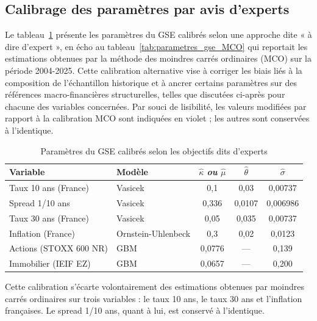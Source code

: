\subsection{Calibrage des paramètres par avis d'experts}

Le tableau~\ref{tab:parametres_gse_experts} présente les paramètres du GSE calibrés selon une approche dite « à dire d'expert », en écho au tableau~\ref{tab:parametres_gse_MCO} qui reportait les estimations obtenues par la méthode des moindres carrés ordinaires (MCO) sur la période 2004-2025.
Cette calibration alternative vise à corriger les biais liés à la composition de l'échantillon historique et à ancrer certains paramètres sur des références macro-financières structurelles, telles que discutées ci-après pour chacune des variables concernées. Par souci de lisibilité, les valeurs modifiées par rapport à la calibration MCO sont indiquées en violet ; les autres sont conservées à l'identique.

\begin{table}[H]
\centering
\caption{Paramètres du GSE calibrés selon les objectifs dits d'experts}
\label{tab:parametres_gse_experts}
\begin{tabular}{llccc}
\hline
\textbf{Variable} & \textbf{Modèle} & $\hat{\kappa}$ \textit{ou} $\hat{\mu}$ & $\hat{\theta}$ & $\hat{\sigma}$ \\
\hline
Taux 10 ans (France)   & Vasicek & \textcolor[HTML]{A100FF}{0,1} & \textcolor[HTML]{A100FF}{0,03} & 0,00737 \\
Spread 1/10 ans   & Vasicek & 0,336 & 0,0107 & 0,006986 \\
Taux 30 ans (France)   & Vasicek & \textcolor[HTML]{A100FF}{0,05} & \textcolor[HTML]{A100FF}{0,035} & 0,00737 \\
Inflation (France)     & Ornstein-Uhlenbeck & \textcolor[HTML]{A100FF}{0,3} & \textcolor[HTML]{A100FF}{0,02} & 0,0123 \\
Actions (STOXX 600 NR) & GBM & 0,0776 & — & 0,139 \\
Immobilier (IEIF EZ)   & GBM & 0,0657 & — & 0,200 \\
\hline
\end{tabular}
\end{table}

Cette calibration s'écarte volontairement des estimations obtenues par moindres carrés ordinaires sur trois variables : le taux 10 ans, le taux 30 ans et l'inflation françaises. Le spread 1/10 ans, quant à lui, est conservé à l'identique.

